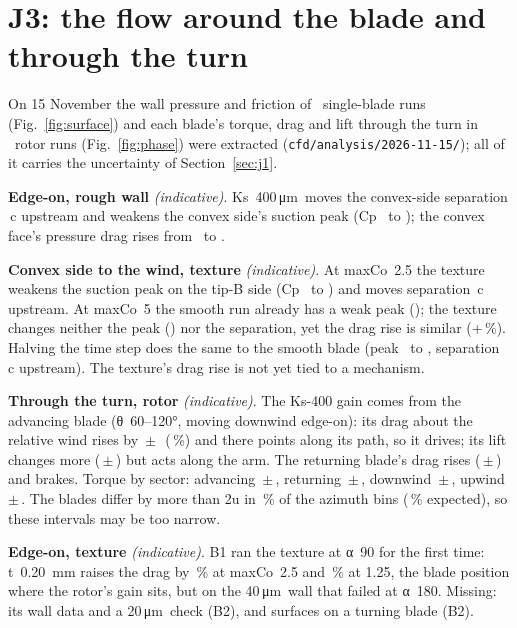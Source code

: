 \documentclass[10pt]{article}
\newcommand{\indic}{\textit{(indicative)}}
\newcommand{\um}{\,\si{\micro\metre}}
\newcommand{\pmu}{\,$\pm$\,}
\begin{document}
\section{J3: the flow around the blade and through the turn}\label{sec:j3}
On 15 November the wall pressure and friction of \nSurfCases\ single-blade runs (Fig.~\ref{fig:surface})
and each blade's torque, drag and lift through the turn in \nPfRuns\ rotor runs (Fig.~\ref{fig:phase}) were
extracted (\texttt{cfd/analysis/2026-11-15/}); all of it carries the uncertainty of Section~\ref{sec:j1}.

\textbf{Edge-on, rough wall} \indic. Ks~400\um\ moves the convex-side separation \nSSepShiftNinety\,c
upstream and weakens the convex side's suction peak (Cp \nSCpWfNinetyZero\ to \nSCpWfNinetyFour); the
convex face's pressure drag rises from \nSCdpWfNinetyZero\ to \nSCdpWfNinetyFour.

\textbf{Convex side to the wind, texture} \indic. At maxCo~2.5 the texture weakens the suction peak on the
tip-B side (Cp \nSCpTexZeroTwoFive\ to \nSCpTexTwoTwoFive) and moves separation \nSSepShiftTex\,c upstream.
At maxCo~5 the smooth run already has a weak peak (\nSCpTexZeroFive); the texture changes neither the peak
(\nSCpTexTwoFive) nor the separation, yet the drag rise is similar (+\nTexEffFive\,\%). Halving the time
step does the same to the smooth blade (peak \nSCpMedTwoFive\ to \nSCpMedOneTwoFive, separation
\nSSepShiftMed\,c upstream). The texture's drag rise is not yet tied to a mechanism.

\textbf{Through the turn, rotor} \indic. The Ks-400 gain comes from the advancing blade (θ~60--120°,
moving downwind edge-on): its drag about the relative wind rises by \nPfAdvCD\pmu\nPfAdvCDU\
(\nPfAdvCDPct\,\%) and there points along its path, so it drives; its lift changes more
(\nPfAdvCL\pmu\nPfAdvCLU) but acts along the arm. The returning blade's drag rises
(\nPfRetCD\pmu\nPfRetCDU) and brakes. Torque by sector: advancing \nSecAdv\pmu\nSecAdvU, returning
\nSecRet\pmu\nSecRetU, downwind \nSecDown\pmu\nSecDownU, upwind \nSecUp\pmu\nSecUpU. The blades differ by
more than 2u in \nPfBladeShare\,\% of the azimuth bins (\nPfBladeExpect\,\% expected), so these intervals
may be too narrow.

\textbf{Edge-on, texture} \indic. B1 ran the texture at α~90 for the first time: t~0.20~mm raises the drag
by \nBoneTexNinetyA\,\% at maxCo~2.5 and \nBoneTexNinetyB\,\% at 1.25, the blade position where the
rotor's gain sits, but on the 40\um\ wall that failed at α~180. Missing: its wall data and a 20\um\
check (B2), and surfaces on a turning blade (B2).
\end{document}
